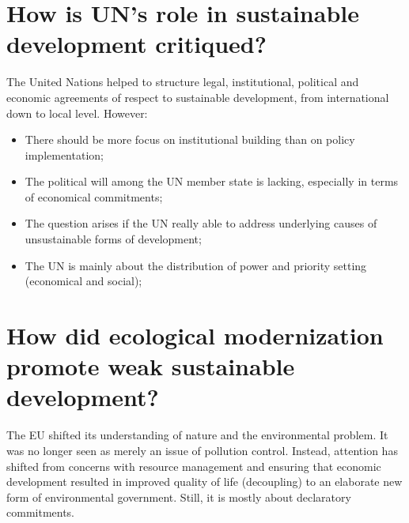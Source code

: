 \section{How is UN's role in sustainable development critiqued?}
The United Nations helped to structure legal, institutional, political and economic agreements of respect to sustainable development, from international down to local level. However:
\begin{itemize}
\item There should be more focus on institutional building than on policy implementation;
\item The political will among the UN member state is lacking, especially in terms of economical commitments;
\item The question arises if the UN really able to address underlying causes of unsustainable forms of development;
\item The UN is mainly about the distribution of power and priority setting (economical and social);
\end{itemize}

\section{How did ecological modernization promote weak sustainable development?}
The EU shifted its understanding of nature and the environmental problem. It was no longer seen as merely an issue of pollution control. Instead, attention has shifted from concerns with resource management and ensuring that economic development resulted in improved quality of life (decoupling) to an elaborate new form of environmental government. Still, it is mostly about declaratory commitments. 

\clearpage